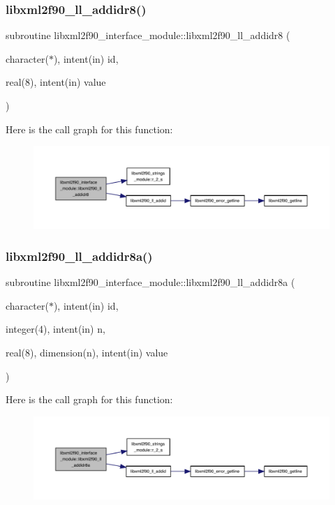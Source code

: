 \subsubsection{\texorpdfstring{libxml2f90\+\_\+ll\+\_\+addidr8()}{libxml2f90\_ll\_addidr8()}}
{\footnotesize\ttfamily subroutine libxml2f90\+\_\+interface\+\_\+module\+::libxml2f90\+\_\+ll\+\_\+addidr8 (\begin{DoxyParamCaption}\item[{character($\ast$), intent(in)}]{id,  }\item[{real(8), intent(in)}]{value }\end{DoxyParamCaption})}

Here is the call graph for this function\+:
\nopagebreak
\begin{figure}[H]
\begin{center}
\leavevmode
\includegraphics[width=350pt]{namespacelibxml2f90__interface__module_a74e6744ce3a60bdf75d94db9e9683fa8_cgraph}
\end{center}
\end{figure}
\mbox{\label{namespacelibxml2f90__interface__module_a2532faf7ac758a77d95784b4bf95e13d}} 
\subsubsection{\texorpdfstring{libxml2f90\+\_\+ll\+\_\+addidr8a()}{libxml2f90\_ll\_addidr8a()}}
{\footnotesize\ttfamily subroutine libxml2f90\+\_\+interface\+\_\+module\+::libxml2f90\+\_\+ll\+\_\+addidr8a (\begin{DoxyParamCaption}\item[{character($\ast$), intent(in)}]{id,  }\item[{integer(4), intent(in)}]{n,  }\item[{real(8), dimension(n), intent(in)}]{value }\end{DoxyParamCaption})}

Here is the call graph for this function\+:
\nopagebreak
\begin{figure}[H]
\begin{center}
\leavevmode
\includegraphics[width=350pt]{namespacelibxml2f90__interface__module_a2532faf7ac758a77d95784b4bf95e13d_cgraph}
\end{center}
\end{figure}
